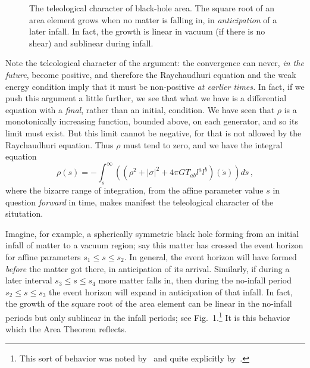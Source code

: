 \documentclass[12pt]{article}
\newcommand{\as}{{\acute s}}
\begin{document}
\begin{figure}
\caption{The teleological character of black-hole area.  The square root of an area element grows when no matter is falling in, in {\em anticipation} of a later infall.  In fact, the growth is linear in vacuum (if there is no shear) and sublinear during infall.}
\label{fig:telarea}
\end{figure}

Note the teleological character of the argument:  the convergence can never, {\em in the future}, become positive, and therefore the Raychaudhuri equation and the weak energy condition imply that it must be non-positive {\em at earlier times.}
In fact, if we push this argument a little further, we see that what we have is a differential equation with a {\em final}, rather than an initial, condition.  We have seen that $\rho$ is a monotonically increasing function, bounded above, on each generator, and so its limit must exist.  But this limit cannot be negative, for that is not allowed by the Raychaudhuri equation.  Thus $\rho$ must tend to zero, and we have the integral equation
\begin{equation}\label{rhoint}
\rho (s)=-\int _{s}^\infty ( (\rho ^2+|\sigma |^2 +4\pi G T_{ab}l^al^b)(\as ) )d\as\, ,
\end{equation}
where the bizarre range of integration, from the affine parameter value $s$ in question {\em forward} in time, makes manifest the teleological character of the situtation.




Imagine, for example, a spherically symmetric black hole forming from an initial infall of matter to a vacuum region; say this matter has crossed the event horizon for affine parameters $s_1\leq s\leq s_2$.  In general, the event horizon will have formed {\em before} the matter got there, in anticipation of its arrival.  Similarly, if during a later interval $s_3\leq s\leq s_4$ more matter falls in, then during the no-infall period $s_2\leq s\leq s_3$ the event horizon will expand in anticipation of that infall.  In fact, the growth of the square root of the area element can be linear in the no-infall periods but only sublinear in the infall periods; see Fig.~1.\footnote{This sort of behavior was noted by~\citet{Carter:1979} and quite explicitly by~\citet{Booth:2005qc}.}  It is this behavior which the Area Theorem reflects.
\end{document}
